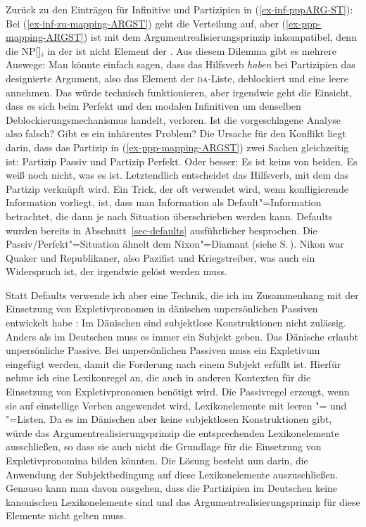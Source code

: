 {Zurück zu den Einträgen für Infinitive und Partizipien in (\ref{ex-inf-pppARG-ST}): 
Bei (\ref{ex-inf-zu-mapping-ARGST}) geht die Verteilung auf, aber (\ref{ex-ppp-mapping-ARGST}) ist mit
dem Argumentrealisierungsprinzip inkompatibel, denn die NP[\str]$_i$ in der \subjl ist nicht Element
der \argstl. Aus diesem Dilemma gibt es mehrere Auswege: Man könnte einfach sagen, dass das
Hilfsverb \emph{haben} bei Partizipien das designierte Argument, also das Element der \textsc{da}-Liste, deblockiert
und eine leere \subjl annehmen. Das würde technisch funktionieren, aber irgendwie geht die Einsicht,
dass es sich beim Perfekt und den modalen Infinitiven um denselben Deblockierungsmechanismus handelt, verloren. Ist die vorgeschlagene
Analyse also falsch? Gibt es ein inhärentes Problem? Die Ursache für den Konflikt liegt darin, dass
das Partizip in (\ref{ex-ppp-mapping-ARGST}) zwei Sachen gleichzeitig ist: Partizip Passiv und
Partizip Perfekt. Oder besser: Es ist keins von beiden. Es weiß noch nicht, was es ist. Letztendlich
entscheidet das Hilfsverb, mit dem das Partizip verknüpft wird.
Ein Trick, der oft verwendet wird, wenn konfligierende Information vorliegt, ist, dass man Information als
Default"=Information betrachtet, die dann je nach Situation überschrieben werden kann. Defaults
wurden bereits in Abschnitt~\ref{sec-defaults} ausführlicher besprochen. Die Passiv/Perfekt"=Situation
ähnelt dem Nixon"=Diamant (siehe S.\,\pageref{abb-nixon}). Nikon war Quaker und Republikaner, also
Pazifist und Kriegstreiber, was auch ein Widerspruch ist, der irgendwie gelöst werden muss.

Statt Defaults verwende ich aber eine Technik, die ich im Zusammenhang mit der Einsetzung von
Expletivpronomen in dänischen unpersönlichen Passiven entwickelt habe
\citep{MuellerDanishImpersonalPassive}: Im Dänischen sind subjektlose Konstruktionen nicht zulässig.
Anders als im Deutschen muss es immer ein Subjekt geben. Das Dänische erlaubt unpersönliche
Passive. Bei unpersönlichen Passiven muss ein Expletivum eingefügt werden, damit die Forderung nach
einem Subjekt erfüllt ist. Hierfür nehme ich eine Lexikonregel an, die auch in anderen Kontexten für
die Einsetzung von Expletivpronomen benötigt wird. Die Passivregel erzeugt, wenn sie auf einstellige
Verben angewendet wird, Lexikonelemente mit leeren
\subj"= und \comps"=Listen. Da es im Dänischen aber keine subjektlosen Konstruktionen gibt, würde
das Argumentrealisierungsprinzip die entsprechenden Lexikonelemente ausschließen, so dass sie auch
nicht die Grundlage für die Einsetzung von Expletivpronomina bilden könnten. Die Lösung besteht nun
darin, die Anwendung der Subjektbedingung auf diese Lexikonelemente auszuschließen. Genauso kann man
davon ausgehen, dass die Partizipien im Deutschen keine kanonischen Lexikonelemente sind und das
Argumentrealisierungsprinzip für diese Elemente nicht gelten muss.

}
